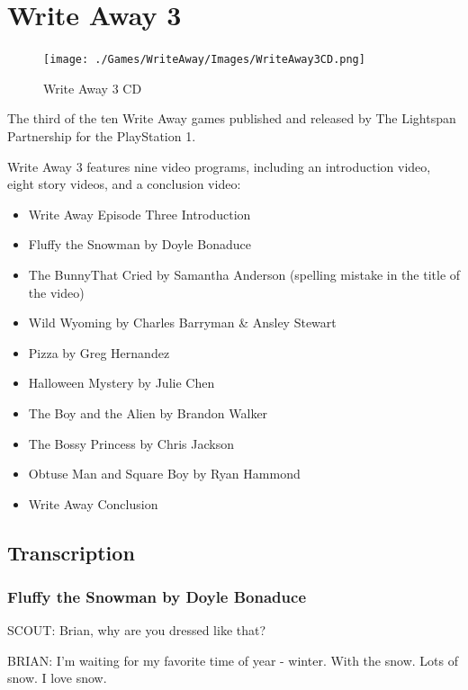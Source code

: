 \chapter{Write Away 3}

\begin{figure}[H]
    \centering
    \texttt{[image: ./Games/WriteAway/Images/WriteAway3CD.png]}
    \caption{Write Away 3 CD}
\end{figure}

The third of the ten Write Away games published and released by The Lightspan Partnership for the PlayStation 1.

Write Away 3 features nine video programs, including an introduction video, eight story videos, and a conclusion video:

\begin{itemize}
    \item Write Away Episode Three Introduction
    \item Fluffy the Snowman by Doyle Bonaduce
    \item The BunnyThat Cried by Samantha Anderson (spelling mistake in the title of the video)
    \item Wild Wyoming by Charles Barryman \& Ansley Stewart
    \item Pizza by Greg Hernandez
    \item Halloween Mystery by Julie Chen
    \item The Boy and the Alien by Brandon Walker
    \item The Bossy Princess by Chris Jackson
    \item Obtuse Man and Square Boy by Ryan Hammond
    \item Write Away Conclusion
\end{itemize}

\clearpage
\newpage

\section{Transcription}

\subsection{Fluffy the Snowman by Doyle Bonaduce}

SCOUT:
Brian, why are you dressed like that?

BRIAN:
I'm waiting for my favorite time of year - winter.
With the snow.
Lots of snow.
I love snow.

